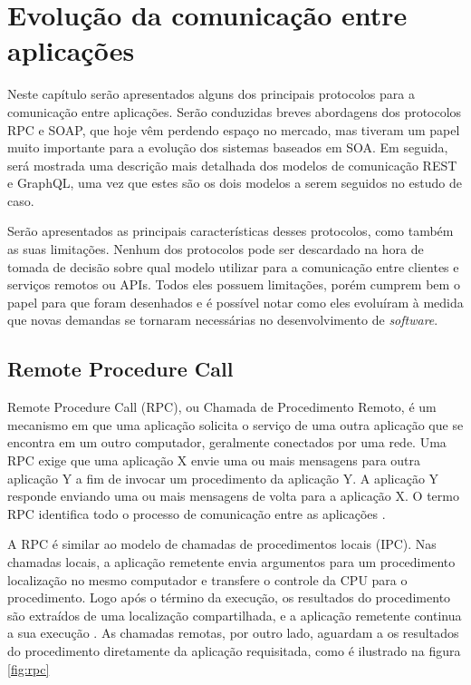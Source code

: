 \chapter[evolucao]{Evolução da comunicação entre aplicações}

Neste capítulo serão apresentados alguns dos principais protocolos para a comunicação entre aplicações. Serão conduzidas breves abordagens dos protocolos RPC e SOAP, que hoje vêm perdendo espaço no mercado, mas tiveram um papel muito importante para a evolução dos sistemas baseados em SOA. Em seguida, será mostrada uma descrição mais detalhada dos modelos de comunicação REST e GraphQL, uma vez que estes são os dois modelos a serem seguidos no estudo de caso.

Serão apresentados as principais características desses protocolos, como também as suas limitações. Nenhum dos protocolos pode ser descardado na hora de tomada de decisão sobre qual modelo utilizar para a comunicação entre clientes e serviços remotos ou APIs. Todos eles possuem limitações, porém cumprem bem o papel para que foram desenhados e é possível notar como eles evoluíram à medida que novas demandas se tornaram necessárias no desenvolvimento de \textit{software}.

\section{Remote Procedure Call}\label{sec:rpc}

Remote Procedure Call (RPC), ou Chamada de Procedimento Remoto, é um mecanismo em que uma aplicação solicita o serviço de uma outra aplicação que se encontra em um outro computador, geralmente conectados por uma rede. Uma RPC exige que uma aplicação X envie uma ou mais mensagens para outra aplicação Y a fim de invocar um procedimento da aplicação Y. A aplicação Y responde enviando uma ou mais mensagens de volta para a aplicação X. O termo RPC identifica todo o processo de comunicação entre as aplicações \cite{merrick2006xml}.

A RPC é similar ao modelo de  chamadas de procedimentos locais (IPC). Nas chamadas locais, a aplicação remetente envia argumentos para um procedimento localização no mesmo computador e transfere o controle da CPU para o procedimento. Logo após o término da execução, os resultados do procedimento são extraídos de uma localização compartilhada, e a aplicação remetente continua a sua execução \cite{rfc1831:rpc}. As chamadas remotas, por outro lado, aguardam a os resultados do procedimento diretamente da aplicação requisitada, como é ilustrado na figura \ref{fig:rpc}

